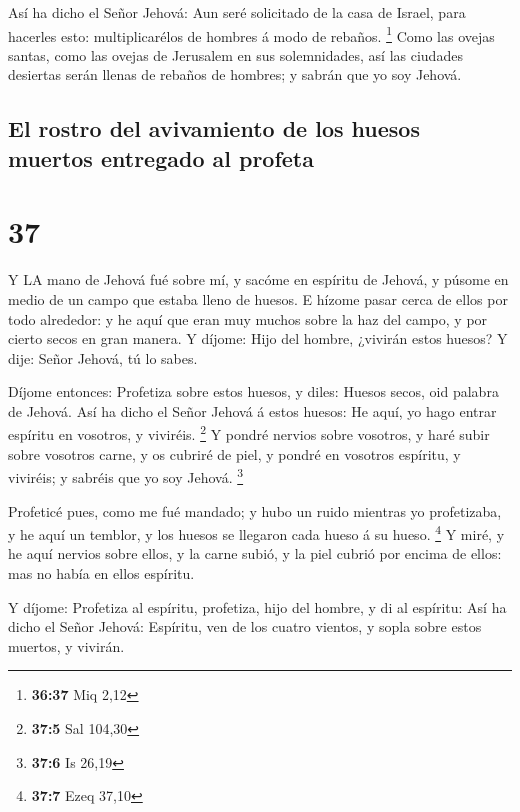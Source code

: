  Así ha dicho el Señor Jehová: Aun seré solicitado de la
casa de Israel, para hacerles esto: multiplicarélos de hombres á modo de
rebaños. \footnote{\textbf{36:37} Miq 2,12}  Como las
ovejas santas, como las ovejas de Jerusalem en sus solemnidades, así las
ciudades desiertas serán llenas de rebaños de hombres; y sabrán que yo
soy Jehová.

\hypertarget{el-rostro-del-avivamiento-de-los-huesos-muertos-entregado-al-profeta}{%
\subsection{El rostro del avivamiento de los huesos muertos entregado al
profeta}\label{el-rostro-del-avivamiento-de-los-huesos-muertos-entregado-al-profeta}}

\hypertarget{section-36}{%
\section{37}\label{section-36}}

 Y LA mano de Jehová fué sobre mí, y sacóme en espíritu de
Jehová, y púsome en medio de un campo que estaba lleno de huesos.
 E hízome pasar cerca de ellos por todo alrededor: y he aquí
que eran muy muchos sobre la haz del campo, y por cierto secos en gran
manera.  Y díjome: Hijo del hombre, ¿vivirán estos huesos? Y
dije: Señor Jehová, tú lo sabes.

 Díjome entonces: Profetiza sobre estos huesos, y diles:
Huesos secos, oid palabra de Jehová.  Así ha dicho el Señor
Jehová á estos huesos: He aquí, yo hago entrar espíritu en vosotros, y
viviréis. \footnote{\textbf{37:5} Sal 104,30}  Y pondré
nervios sobre vosotros, y haré subir sobre vosotros carne, y os cubriré
de piel, y pondré en vosotros espíritu, y viviréis; y sabréis que yo soy
Jehová. \footnote{\textbf{37:6} Is 26,19}

 Profeticé pues, como me fué mandado; y hubo un ruido
mientras yo profetizaba, y he aquí un temblor, y los huesos se llegaron
cada hueso á su hueso. \footnote{\textbf{37:7} Ezeq 37,10} 
Y miré, y he aquí nervios sobre ellos, y la carne subió, y la piel
cubrió por encima de ellos: mas no había en ellos espíritu.

 Y díjome: Profetiza al espíritu, profetiza, hijo del
hombre, y di al espíritu: Así ha dicho el Señor Jehová: Espíritu, ven de
los cuatro vientos, y sopla sobre estos muertos, y vivirán.


